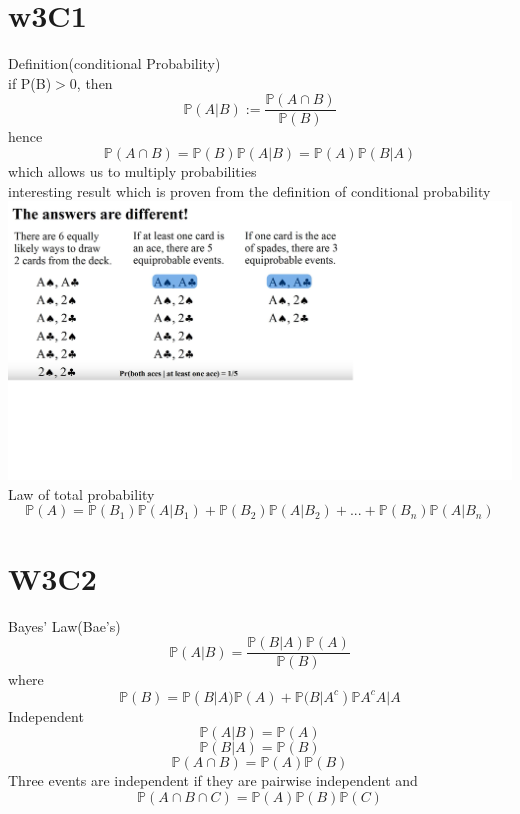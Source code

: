 \documentclass{article}
\begin{document}
\section{w3C1}
Definition(conditional Probability)\\
if P(B)$>$0, then
$$
\mathbb{P}(A|B):=\frac{\mathbb{P}{(A \cap B)}}{\mathbb{P}(B)}
$$
hence
$$
\mathbb{P}(A \cap B)=\mathbb{P}(B)\mathbb{P}(A|B)=\mathbb{P}(A)\mathbb{P}(B|A)
$$
which allows us to multiply probabilities \\
interesting result which is proven from the definition of conditional probability\\
\includegraphics[width=\textwidth]{different}
Law of total probability
$$
\mathbb{P}(A)=\mathbb{P}(B_1)\mathbb{P}(A|B_1)+\mathbb{P}(B_2)\mathbb{P}(A|B_2)+...+\mathbb{P}(B_n)\mathbb{P}(A|B_n)
$$
\section {W3C2}
Bayes' Law(Bae's)
$$
\mathbb{P}(A|B)=\frac{\mathbb{P}{(B|A)}\mathbb{P}{(A)}}{\mathbb{P}(B)}
$$
where
$$
\mathbb{P}{(B)}=\mathbb{P}(B|A)\mathbb{P}(A)+\mathbb{P}(B|A^c)\mathbb{P}A^c
A|A$$
Independent
$$
\mathbb{P}(A|B)=\mathbb P (A)
$$
$$
\mathbb P (B|A)=\mathbb P (B)
$$
$$
\mathbb P (A\cap B)=\mathbb P (A) \mathbb P (B)
$$
Three events are independent if they are pairwise independent and
$$
\mathbb P (A\cap B \cap C)=\mathbb P(A)\mathbb P(B) \mathbb P(C)
$$
\end{document}
